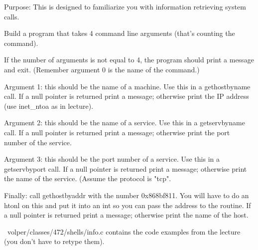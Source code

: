 

\parindent 0pt

Purpose: This is designed to familiarize you with information
retrieving system calls.

Build a program that takes 4 command line arguments
(that's counting the command).

If the number of arguments is not equal to 4, the program
should print a message and exit.
(Remember argument 0 is the name of the command.)

Argument 1: this should be the name of a machine.
Use this in a {\ltt{}gethostbyname} call.
If a {\ltt{}null} pointer is returned print a message;
otherwise print the IP address (use {\ltt{}inet_ntoa} as in lecture).

Argument 2: this should be the name of a service.
Use this in a {\ltt{}getservbyname} call.
If a {\ltt{}null} pointer is returned print a message;
otherwise print the port number of the service.

Argument 3: this should be the port number of a service.
Use this in a {\ltt{}getservbyport} call.
If a {\ltt{}null} pointer is returned print a message;
otherwise print the name of the service.
(Assume the protocol is {\ltt{}"tcp"}.

Finally: call {\ltt{}gethostbyaddr} with the number
{\ltt{}0x868bf811}. You will have to do an {\ltt{}htonl}
on this and put it into an {\ltt{}int} so you can pass the
address to the routine.
If a {\ltt{}null} pointer is returned print a message;
otherwise print the name of the host.

{\ltt{}~volper/classes/472/shells/info.c} contains 
the code examples from the lecture
(you don't have to retype them).
\bye
